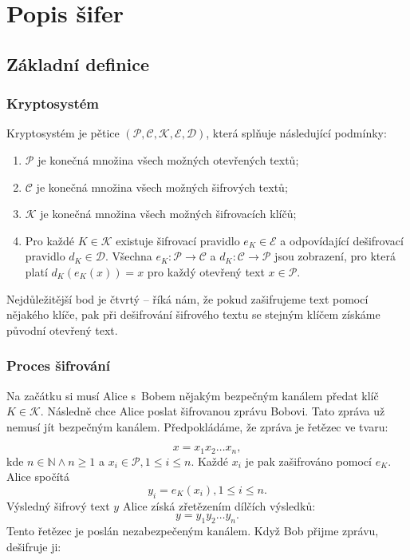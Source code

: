 \documentclass[12pt]{article}
\theoremstyle{definition}
\newcommand{\setp}{\mathcal{P}}
\newcommand{\setc}{\mathcal{C}}
\newcommand{\setk}{\mathcal{K}}
\newcommand{\setd}{\mathcal{D}}
\newcommand{\sete}{\mathcal{E}}
\begin{document}
\newpage
\section{Popis šifer}





\subsection{Základní definice}
\label{defs}
\subsubsection{Kryptosystém}
Kryptosystém je pětice $(\setp, \setc, \setk, \sete, \setd)$, která splňuje následující podmínky:

\begin{enumerate}
\item $\setp$ je konečná množina všech možných otevřených textů;
\item $\setc$ je konečná množina všech možných šifrových textů;
\item $\setk$ je konečná množina všech možných šifrovacích klíčů;
\item Pro každé $K\in \setk$ existuje šifrovací pravidlo $e_K\in\sete$ a odpovídající dešifrovací pravidlo $d_K\in\setd$. Všechna $e_K:\setp\rightarrow\setc$ a $d_K:\setc\rightarrow\setp$ jsou zobrazení, pro která platí $d_K\left(e_K\left(x\right)\right)=x$ pro každý otevřený text $x\in\setp$.
\end{enumerate}

Nejdůležitější bod je čtvrtý -- říká nám, že pokud zašifrujeme text pomocí nějakého klíče, pak při dešifrování šifrového textu se stejným klíčem získáme původní otevřený text. 



\subsubsection{Proces šifrování}
Na začátku si musí Alice s~Bobem nějakým bezpečným kanálem předat klíč $K\in\setk$. Následně chce Alice poslat šifrovanou zprávu Bobovi. Tato zpráva už nemusí jít bezpečným kanálem. Předpokládáme, že zpráva je řetězec ve tvaru: 

$$x=x_1x_2\ldots x_n,$$
kde $n\in\mathbb{N} \wedge n\ge1$ a $x_i\in\setp, 1\le i \le n$. Každé $x_i$ je pak zašifrováno pomocí $e_K$. Alice spočítá
 $$y_i=e_K\left(x_i\right), 1\le i \le n.$$  
Výsledný šifrový text $y$ Alice získá zřetězením dílčích výsledků:
$$y=y_1y_2\ldots y_n.$$
Tento řetězec je poslán nezabezpečeným kanálem. Když Bob přijme zprávu, dešifruje ji: 
\end{document}
